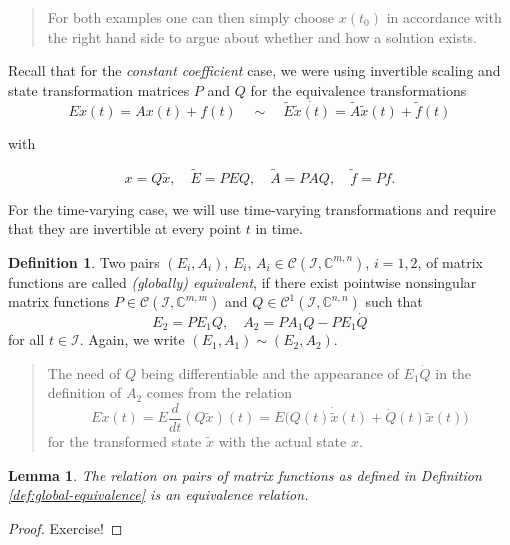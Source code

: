 \documentclass[]{book}
\newenvironment {JHSAYS} [0] {\begin{quote}\color{jhsc}} {\end{quote}}
\newtheorem{lemma}{Lemma}[chapter]
\theoremstyle{definition}
\newtheorem{definition}{Definition}[chapter]
\theoremstyle{definition}
\theoremstyle{definition}
\theoremstyle{definition}
\theoremstyle{remark}
\begin{document}
\begin{JHSAYS}
For both examples one can then simply choose \(x(t_0)\) in accordance
with the right hand side to argue about whether and how a solution
exists.
\end{JHSAYS}

Recall that for the \emph{constant coefficient} case, we were using invertible scaling and state transformation matrices \(P\) and \(Q\) for the equivalence transformations
\[
E \dot x(t) = Ax(t) +f(t) \quad \sim \quad \tilde E \dot {\tilde x(t)} = \tilde A\tilde x(t) +\tilde f(t) 
\]

with

\[
x=Q\tilde x, \quad \tilde E = PEQ, \quad \tilde A = PAQ, \quad \tilde f = Pf.
\]

For the time-varying case, we will use time-varying transformations and require that they are invertible at every point \(t\) in time.

\begin{definition}
\protect\hypertarget{def:global-equivalence}{}{\label{def:global-equivalence} }Two pairs \((E_i,A_i)\), \(E_i\), \(A_i \in \mathcal C(\mathcal I, \mathbb C^{m,n})\),
\(i=1,2\), of matrix functions are called \emph{(globally) equivalent}, if there exist
pointwise nonsingular matrix functions \(P\in \mathcal C(\mathcal I, \mathbb C^{m,m})\) and \(Q\in \mathcal C^1(\mathcal I, \mathbb C^{n,n})\) such that
\begin{equation}
E_2=PE_1Q, \quad A_2 = PA_1Q-PE_1\dot Q \label{eq:iv-glob-equiv-mpairs}
\end{equation}
for all \(t\in \mathcal I\). Again, we write \((E_1,A_1) \sim (E_2, A_2)\).
\end{definition}

\begin{JHSAYS}
The need of \(Q\) being differentiable and the appearance of
\(E_1\dot Q\) in the definition of \(A_2\) comes from the relation \[
E\dot x(t) = E\frac{d}{dt} (Q\tilde x)(t) = E\bigl(Q(t)\dot {\tilde x}(t) + \dot Q(t)\tilde x(t) \bigr)
\] for the transformed state \(\tilde x\) with the actual state \(x\).
\end{JHSAYS}

\begin{lemma}
\protect\hypertarget{lem:iv-glob-equiv-rst}{}{\label{lem:iv-glob-equiv-rst} }The relation on pairs of matrix functions as defined in Definition \ref{def:global-equivalence} is an equivalence relation.
\end{lemma}

\begin{proof}
{}Exercise!
\end{proof}
\end{document}
